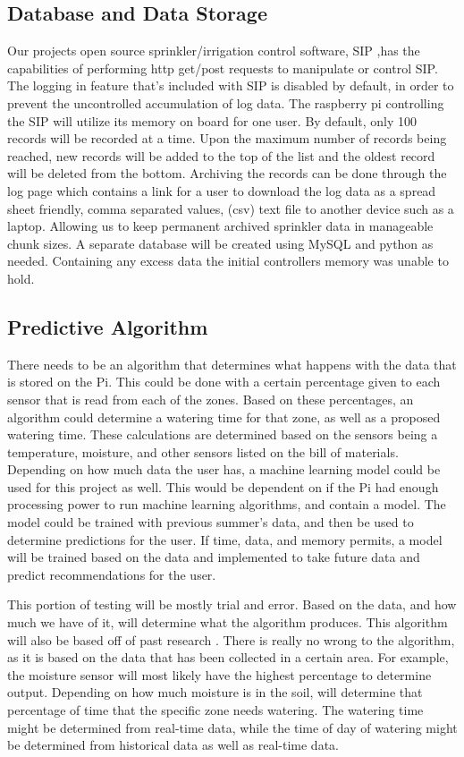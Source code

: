 \documentclass[letterpaper, 10 pt, conference]{ieeeconf}  %
\begin{document}
\subsection{Database and Data Storage}
Our projects open source sprinkler/irrigation control software, SIP \cite{SIP},has the capabilities of performing http get/post requests to manipulate or control SIP. The logging in feature that's included with SIP is disabled by default, in order to prevent the uncontrolled accumulation of log data. The raspberry pi controlling the SIP will utilize its memory on board for one user. By default, only 100 records will be recorded at a time. Upon the maximum number of records being reached, new records will be added to the top of the list and the oldest record will be deleted from the bottom. Archiving the records can be done through the log page which contains a link for a user to download the log data as a spread sheet friendly, comma separated values, (csv) text file to another device such as a laptop. Allowing us to keep permanent archived sprinkler data in manageable chunk sizes.
A separate database will be created using MySQL and python as needed. Containing any excess data the initial controllers memory was unable to hold.


\subsection{Predictive Algorithm}
There needs to be an algorithm that determines what happens with the data that is stored on the Pi. This could be done with a certain percentage given to each sensor that is read from each of the zones. Based on these percentages, an algorithm could determine a watering time for that zone, as well as a proposed watering time. These calculations are determined based on the sensors being a temperature, moisture, and other sensors listed on the bill of materials. Depending on how much data the user has, a machine learning model could be used for this project as well. This would be dependent on if the Pi had enough processing power to run machine learning algorithms, and contain a model. The model could be trained with previous summer's data, and then be used to determine predictions for the user. If time, data, and memory permits, a model will be trained based on the data and implemented to take future data and predict recommendations for the user. 

This portion of testing will be mostly trial and error. Based on the data, and how much we have of it, will determine what the algorithm produces. This algorithm will also be based off of past research \cite{SmartSprinkler}. There is really no wrong to the algorithm, as it is based on the data that has been collected in a certain area. For example, the moisture sensor will most likely have the highest percentage to determine output. Depending on how much moisture is in the soil, will determine that percentage of time that the specific zone needs watering. The watering time might be determined from real-time data, while the time of day of watering might be determined from historical data as well as real-time data. 
\end{document}

